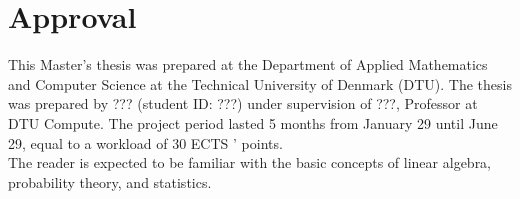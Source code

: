 \section*{Approval}
This Master's thesis was prepared at the Department of Applied Mathematics and Computer Science at the Technical
University of Denmark (DTU). The thesis was prepared by ??? (student ID: ???) under supervision of ???, Professor
at DTU Compute. The project period lasted 5 months from January 29 until June 29, equal to a workload of 30 ECTS '
points. \\

The reader is expected to be familiar with the basic concepts of linear algebra, probability theory, and statistics.

\vfill

\begin{center}
\namesigdate{\thesisauthor~-~\studentnumber}
\end{center}

\vfill
